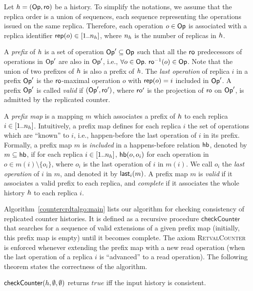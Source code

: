 Let ${h} = (\mathsf{Op}, \mathsf{ro})$ be a history.
To simplify the notations, we assume that the replica order is a union of sequences, each sequence representing the operations issued on the same replica.
Therefore, each operation $o\in \mathsf{Op}$ is associated with a replica identifier ${\sf rep}(o)\in [1..n_{h}]$, where $n_{h}$ is the number of replicas in ${h}$.

A \emph{prefix} of ${h}$ is a set of operation $\mathsf{Op}'\subseteq \mathsf{Op}$ such that all the $\mathsf{ro}$ predecessors of operations in $\mathsf{Op}'$ are also in $\mathsf{Op}'$, i.e., $\forall {o}\in \mathsf{Op}.\ \mathsf{ro}^{-1}({o})\in \mathsf{Op}$. Note that the union of two prefixes of ${h}$ is also a prefix of ${h}$. The \emph{last operation} of replica $i$ in a prefix $\mathsf{Op}'$ is the $\mathsf{ro}$-maximal operation $o$ with ${\sf rep}(o)=i$ included in $\mathsf{Op}'$.
A prefix $\mathsf{Op}'$ is called \emph{valid} if $(\mathsf{Op}',\mathsf{ro}')$, where $\mathsf{ro}'$ is the projection of $\mathsf{ro}$ on $\mathsf{Op}'$, is admitted by the replicated counter.

A \emph{prefix map} is a mapping $m$ which associates a prefix of ${h}$ to each replica $i\in [1..n_{h}]$.
Intuitively, a prefix map defines for each replica $i$ the set of operations which are ``known'' to $i$, i.e., happen-before the last operation of $i$ in its prefix. Formally, a prefix map $m$ is \emph{included} in a happens-before relation $\textsf{hb}$, denoted by $m\subseteq \textsf{hb}$, if for each replica $i\in [1..n_{h}]$, $\textsf{hb}(o,o_i)$ for each operation in $o\in m(i)\setminus\{o_i\}$, where $o_i$ is the last operation of $i$ in $m(i)$. We call $o_i$ the \emph{last operation} of $i$ in $m$, and denoted it by ${\sf last}_i(m)$.
A prefix map $m$ is \emph{valid} if it associates a valid prefix to each replica, and \emph{complete} if it associates the whole history ${h}$ to each replica $i$.

Algorithm~\ref{countercrdtalgo:main} lists our algorithm for checking consistency of replicated counter histories. It is defined as a recursive procedure $\mathsf{checkCounter}$ that searches for a sequence of valid extensions of a given prefix map (initially, this prefix map is empty) until it becomes complete. The axiom \textsc{RetvalCounter} is enforced whenever extending the prefix map with a new {\sf read} operation (when the last operation of a replica $i$ is ``advanced'' to a {\sf read} operation). The following theorem states the correctness of the algorithm.

\vspace{-2mm}
\begin{theorem}

  $\mathsf{checkCounter}({h},\emptyset,\emptyset)$ returns $\mathit{true}$ if{f} the input history is consistent.

\vspace{-2mm}
\end{theorem}

